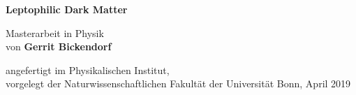 \begin{titlepage}
\thispagestyle{empty}
   \begin{center}
       \vspace*{1cm}
 
       {\Huge\textbf{Leptophilic Dark Matter}}
 
       \vspace{0.5cm}
 
       \vspace{1.5cm}
       Masterarbeit in Physik\\
       
       von 
       \textbf{Gerrit Bickendorf}
 
       \vfill
 
       angefertigt im Physikalischen Institut,\\
       vorgelegt der Naturwissenschaftlichen Fakultät der Universität Bonn, April 2019
 
       \vspace{0.8cm}
 
   \end{center}
\end{titlepage}